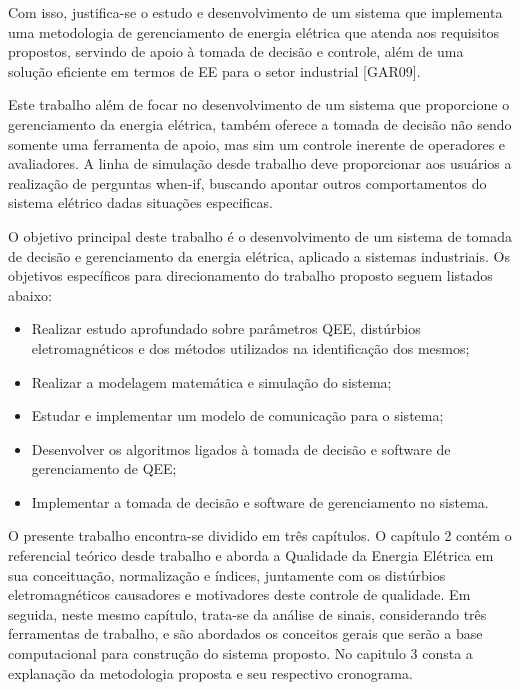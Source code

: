 \par
Com isso, justifica-se o estudo e desenvolvimento de um sistema que implementa uma metodologia de gerenciamento de energia elétrica que atenda aos requisitos propostos, servindo de apoio à tomada de decisão e controle, além de uma solução eficiente em termos de EE para o setor industrial [GAR09].
\par
Este trabalho além de focar no desenvolvimento de um sistema que proporcione o gerenciamento da energia elétrica, também oferece a tomada de decisão não sendo somente uma ferramenta de apoio, mas sim um controle inerente de operadores e avaliadores. A linha de simulação desde trabalho deve proporcionar aos usuários a realização de perguntas when-if, buscando apontar outros comportamentos do sistema elétrico dadas situações especificas.
\par
O objetivo principal deste trabalho é o desenvolvimento de um sistema de tomada de decisão e gerenciamento da energia elétrica, aplicado a sistemas industriais. Os objetivos específicos para direcionamento do trabalho proposto seguem listados abaixo:
\begin{itemize}
	\item Realizar estudo aprofundado sobre parâmetros QEE, distúrbios eletromagnéticos e dos métodos utilizados na identificação dos mesmos;
	\item Realizar a modelagem matemática e simulação do sistema;
	\item Estudar e implementar  um modelo de comunicação para o sistema;
	\item Desenvolver os algoritmos ligados à tomada de decisão e software de gerenciamento de QEE;
	\item Implementar a tomada de decisão e software de gerenciamento no sistema.
\end{itemize}
\par
O presente trabalho encontra-se dividido em três capítulos. O capítulo 2 contém o referencial teórico desde trabalho e aborda a Qualidade da Energia Elétrica em sua conceituação, normalização e índices, juntamente com os distúrbios eletromagnéticos causadores e motivadores deste controle de qualidade. Em seguida, neste mesmo capítulo, trata-se da análise de sinais, considerando três ferramentas de trabalho, e são abordados os conceitos gerais que serão a base computacional para construção do sistema proposto. No capitulo 3 consta a explanação da metodologia proposta e seu respectivo cronograma.
